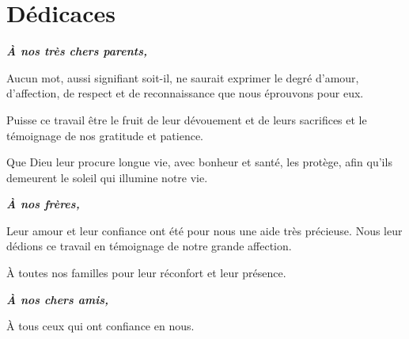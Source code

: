 
\chapter*{Dédicaces}
\justifying

\textbf{\textit{À nos très chers parents,}}

Aucun mot, aussi signifiant soit-il, ne saurait exprimer le degré d'amour, d'affection, de respect et de reconnaissance que nous éprouvons pour eux.

Puisse ce travail être le fruit de leur dévouement et de leurs sacrifices et le témoignage de nos gratitude et patience.

Que Dieu leur procure longue vie, avec bonheur et santé, les protège, afin qu'ils demeurent le soleil qui illumine notre vie.

\vspace{1cm}

\textbf{\textit{À nos frères,}}

Leur amour et leur confiance ont été pour nous une aide très précieuse. Nous leur dédions ce travail en témoignage de notre grande affection.

À toutes nos familles pour leur réconfort et leur présence.

\vspace{1cm}

\textbf{\textit{À nos chers amis,}}

À tous ceux qui ont confiance en nous.